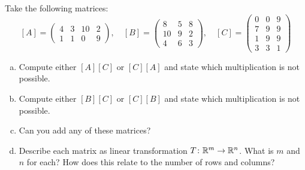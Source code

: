 \documentclass[12pt]{article} %
\begin{document}
\newpage
\begin{problem}
    Take the following matrices:
    \[
        [A] = \begin{pmatrix} 4 & 3 & 10 & 2 \\ 1 & 1 & 0 & 9 \end{pmatrix},\quad [B] = \begin{pmatrix} 8 & 5 & 8 \\ 10 & 9 & 2 \\ 4 & 6 &3 \end{pmatrix}, \quad [C] = \begin{pmatrix} 0 & 0 & 9 \\ 7 & 9 & 9 \\ 1 & 9 & 9 \\ 3 & 3 & 1\end{pmatrix}
    \]
    \begin{enumerate}[(a)]
        \item Compute either $[A][C]$ or $[C][A]$ and state which multiplication is not possible.
        \item Compute either $[B][C]$ or $[C][B]$ and state which multiplication is not possible.
        \item Can you add any of these matrices?
        \item Describe each matrix as linear transformation $T\colon \mathbb{R}^m \to \mathbb{R}^n$. What is $m$ and $n$ for each? How does this relate to the number of rows and columns?
    \end{enumerate}
\end{problem}
\end{document}
